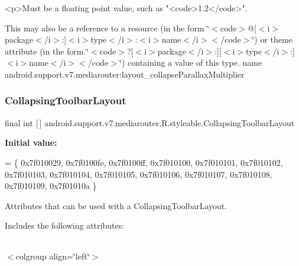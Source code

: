 \begin{DoxyVerb}      <p>Must be a floating point value, such as "<code>1.2</code>".
\end{DoxyVerb}
 

This may also be a reference to a resource (in the form \char`\"{}$<$code$>$@\mbox{[}$<$i$>$package$<$/i$>$\+:\mbox{]}$<$i$>$type$<$/i$>$\+:$<$i$>$name$<$/i$>$$<$/code$>$\char`\"{}) or theme attribute (in the form \char`\"{}$<$code$>$?\mbox{[}$<$i$>$package$<$/i$>$\+:\mbox{]}\mbox{[}$<$i$>$type$<$/i$>$\+:\mbox{]}$<$i$>$name$<$/i$>$$<$/code$>$\char`\"{}) containing a value of this type.  name android.\+support.\+v7.\+mediarouter\+:layout\+\_\+collapse\+Parallax\+Multiplier \mbox{\label{classandroid_1_1support_1_1v7_1_1mediarouter_1_1R_1_1styleable_aae2cb4975e9b9a19d129888f497cc386}} 
\subsubsection{\texorpdfstring{Collapsing\+Toolbar\+Layout}{CollapsingToolbarLayout}}
{\footnotesize\ttfamily final int \mbox{[}$\,$\mbox{]} android.\+support.\+v7.\+mediarouter.\+R.\+styleable.\+Collapsing\+Toolbar\+Layout\hspace{0.3cm}{\ttfamily [static]}}

{\bfseries Initial value\+:}
\begin{DoxyCode}
= \{
            0x7f010029, 0x7f0100fe, 0x7f0100ff, 0x7f010100,
            0x7f010101, 0x7f010102, 0x7f010103, 0x7f010104,
            0x7f010105, 0x7f010106, 0x7f010107, 0x7f010108,
            0x7f010109, 0x7f01010a
        \}
\end{DoxyCode}
Attributes that can be used with a Collapsing\+Toolbar\+Layout. 

Includes the following attributes\+:

\tabulinesep=1mm
\begin{longtabu} spread 0pt [c]{*{0}{|X[-1]}|}
\hline
\end{longtabu}
$<$colgroup align=\char`\"{}left\char`\"{}$>$ 

